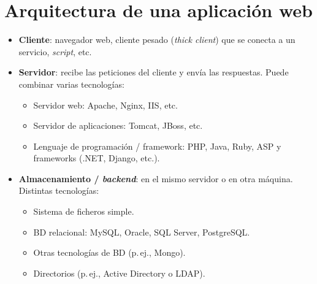 \documentclass[11pt,a4paper]{report}
\begin{document}
\section{Arquitectura de una aplicación web}
 
\begin{center}
\end{center}
 
\begin{itemize}
  \item \textbf{Cliente}: navegador web, cliente pesado (\emph{thick client}) que se conecta a un servicio, \emph{script}, etc.
  \item \textbf{Servidor}: recibe las peticiones del cliente y envía las respuestas. Puede combinar varias tecnologías:
    \begin{itemize}
      \item Servidor web: Apache, Nginx, IIS, etc.
      \item Servidor de aplicaciones: Tomcat, JBoss, etc.
      \item Lenguaje de programación / framework: PHP, Java, Ruby, ASP y frameworks (.NET, Django, etc.).
    \end{itemize}
  \item \textbf{Almacenamiento / \emph{backend}}: en el mismo servidor o en otra máquina. Distintas tecnologías:
    \begin{itemize}
      \item Sistema de ficheros simple.
      \item BD relacional: MySQL, Oracle, SQL Server, PostgreSQL.
      \item Otras tecnologías de BD (p.\,ej., Mongo).
      \item Directorios (p.\,ej., Active Directory o LDAP).
    \end{itemize}
\end{itemize}
 
\end{document}
